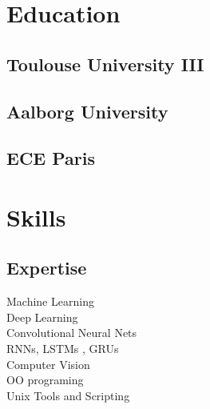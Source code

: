 \documentclass[letterpaper]{deedy-resume} %
\begin{document}
\begin{minipage}[t]{0.33\textwidth} %


\section{Education} 

\subsection{Toulouse University III}

\sectionspace %
\subsection{Aalborg University}

\sectionspace %
\subsection{ECE Paris}


\sectionspace %


\section{Skills}

\subsection{Expertise}

Machine Learning \\
Deep Learning \\
Convolutional Neural Nets \\
RNNs, LSTMs , GRUs\\
Computer Vision \\
OO programing \\
Unix Tools and Scripting\\


\end{minipage}
\end{document}

